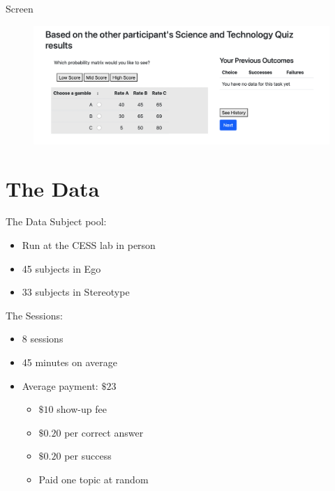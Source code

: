 \documentclass[aspectratio=169]{beamer}
\begin{document}
\begin{frame}{Screen}
    \begin{figure}
        \centering
        \includegraphics[scale=.4]{screen2.png}
    \end{figure}
\end{frame}

\section*{The Data}

\begin{frame}{The Data}
    Subject pool:\\
    \begin{itemize}
        \item Run at the CESS lab in person
        \item 45 subjects in Ego
        \item 33 subjects in Stereotype
    \end{itemize}
    \bigskip
    The Sessions:
    \begin{itemize}
        \item 8 sessions 
        \item 45 minutes on average
        \item Average payment: $\$23$
        \begin{itemize}
            \item $\$10$ show-up fee
            \item $\$ 0.20$ per correct answer
            \item $\$ 0.20$ per success
            \item Paid one topic at random
        \end{itemize}
    \end{itemize}
    
\end{frame}
\end{document}
